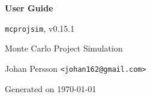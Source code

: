 \documentclass[11pt,b5paper,twoside,openright]{report}
\begin{document}
\begin{titlepage}
  \centering
  \vspace*{2.0cm}
  {\Huge\bfseries\color{brandblue}User Guide\par}
  \vspace{1.2cm}
  {\Large \texttt{mcprojsim}, v0.15.1\par}
  \vspace{1.2cm}
  {\Large Monte Carlo Project Simulation\par}
  \vfill
  {\large Johan Persson \texttt{<johan162@gmail.com>}\par}
  {\large Generated on \today\par}
\end{titlepage}

\cleardoublepage

\tableofcontents
\cleardoublepage


\end{document}
